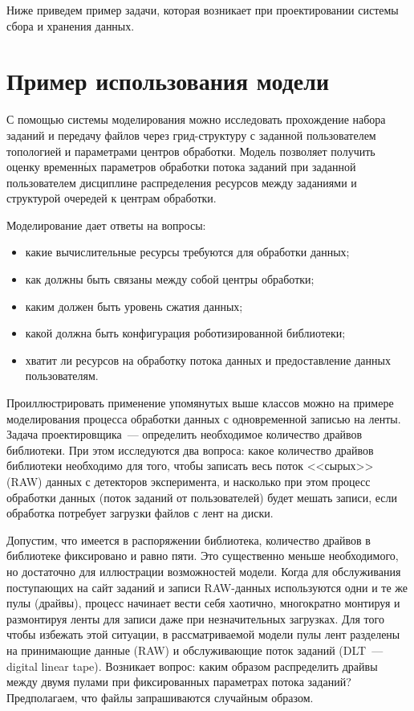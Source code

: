 \begin{multicols}{2}
   Ниже приведем пример задачи, которая возникает при проектировании 
системы сбора и хранения данных. 

\section{Пример использования модели}

   С помощью системы моделирования можно исследовать прохождение набора 
заданий и передачу файлов через грид-струк\-ту\-ру с заданной пользователем 
топологией и параметрами центров обработки. Модель позволяет получить 
оценку временн$\acute{\mbox{ы}}$х параметров обработки потока заданий при заданной 
пользователем дисциплине распределения ресурсов между заданиями и 
структурой очередей к центрам обработки.
   
   Моделирование дает ответы на вопросы:
   \begin{itemize}
   \item какие вычислительные ресурсы требуются для обработки данных;
   \item как должны быть связаны между собой центры обработки;
   \item каким должен быть уровень сжатия данных;
   \item какой должна быть конфигурация роботизированной библиотеки;
   \item хватит ли ресурсов на обработку потока данных и предоставление 
данных пользователям. 
   \end{itemize}
   
   Проиллюстрировать применение упомянутых выше классов можно на 
примере моделирования процесса обработки данных с одновременной \mbox{записью} 
на ленты. Задача проектировщика~--- определить необходимое количество 
драйвов библиотеки. При этом исследуются два вопроса: какое количество 
драйвов библиотеки необходимо для того, чтобы записать весь поток 
<<сырых>> (RAW) данных с детекторов эксперимента, и насколько при этом 
процесс обработки данных (поток заданий от пользователей) будет мешать 
записи, если обработка потребует загрузки файлов с лент на диски.
   
   Допустим, что имеется в распоряжении биб\-ли\-о\-тека, количество драйвов в 
библиотеке фик\-си\-ровано и равно пяти. Это существенно меньше 
необходимого, но достаточно для иллюстрации возмож\-но\-стей модели. Когда 
для обслуживания поступающих на сайт заданий и записи RAW-дан\-ных 
используются одни и те же пулы (драйвы), процесс начинает вести себя 
хаотично, многократно монтируя и размонтируя ленты для записи даже при 
незначительных загрузках. Для того чтобы избежать этой ситуации, в 
рассматриваемой модели пулы лент разделены на принимающие данные 
(RAW) и обслуживающие поток заданий (DLT~--- digital linear tape). Возникает вопрос: каким 
образом распределить драйвы между двумя пулами при фиксированных 
параметрах потока заданий? Предполагаем, что файлы запрашиваются 
случайным образом. 
   

\end{multicols}
